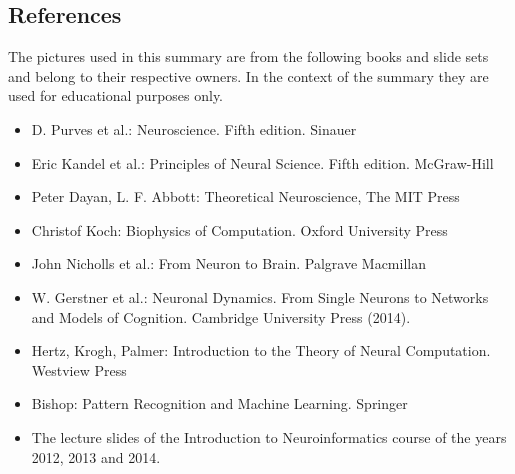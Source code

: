 \documentclass[a4paper, 12pt]{article}
\begin{document}
\subsection{References}
The pictures used in this summary are from the following books and slide sets
and belong to their respective owners. In the context of the summary they are
used for educational purposes only.
\begin{itemize}
\item D. Purves et al.: Neuroscience. Fifth edition. Sinauer
\item Eric Kandel et al.: Principles of Neural Science. Fifth edition.
McGraw-Hill 
\item Peter Dayan, L. F. Abbott: Theoretical Neuroscience, The MIT
Press
\item Christof Koch: Biophysics of Computation. Oxford University Press
\item John Nicholls et al.: From Neuron to Brain. Palgrave Macmillan
\item W. Gerstner et al.: Neuronal Dynamics. From Single Neurons to Networks and
Models of Cognition. Cambridge University Press (2014).
\item Hertz, Krogh, Palmer: Introduction to the Theory of Neural Computation.
Westview Press
\item Bishop: Pattern Recognition and Machine Learning. Springer
\item The lecture slides of the Introduction to Neuroinformatics course of the
years 2012, 2013 and 2014.
\end{itemize}
\end{document}
